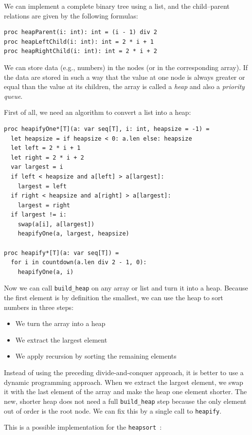 \documentclass[justified, sixbynine]{tufte-book}
\def\ft{\small\tt}
\theoremstyle{plain}%
\newtheorem * {corollary}{Corollary}
\theoremstyle{definition}
\theoremstyle{remark}
\newtheorem * {remark}{Remark}
\newtheorem * {note}{Note}
\begin{document}
\begin{fullwidth}
We can implement a complete binary tree using a list, and the child--parent relations are given by the following formulas:
\begin{lstlisting}
proc heapParent(i: int): int = (i - 1) div 2
proc heapLeftChild(i: int): int = 2 * i + 1
proc heapRightChild(i: int): int = 2 * i + 2
\end{lstlisting}

We can store data (e.g., numbers) in the nodes (or in the corresponding array). If the data are
stored in such a way that the value at one node is always greater or equal than the value at its children, the array is called a {\it heap} and also a {\it priority queue}.

First of all, we need an algorithm to convert a list into a heap:

\begin{lstlisting}
proc heapifyOne*[T](a: var seq[T], i: int, heapsize = -1) =
  let heapsize = if heapsize < 0: a.len else: heapsize
  let left = 2 * i + 1
  let right = 2 * i + 2
  var largest = i
  if left < heapsize and a[left] > a[largest]:
    largest = left
  if right < heapsize and a[right] > a[largest]:
    largest = right
  if largest != i:
    swap(a[i], a[largest])
    heapifyOne(a, largest, heapsize)

proc heapify*[T](a: var seq[T]) =
  for i in countdown(a.len div 2 - 1, 0):
    heapifyOne(a, i)
\end{lstlisting}

Now we can call {\ft build\_heap} on any array or list and turn it into a heap.
Because the first element is by definition the smallest, we can use the heap to sort numbers in three steps:
\begin{itemize}
\item We turn the array into a heap
\item We extract the largest element
\item We apply recursion by sorting the remaining elements
\end{itemize}
Instead of using the preceding divide-and-conquer approach, it is better to use a dynamic programming approach. When we extract the largest element, we swap it with the last element of the array and make the heap one element shorter. The new, shorter heap does not need a full {\ft build\_heap} step because the only element out of order is the root node. We can fix this by a single call to {\ft heapify}.

This is a possible implementation for the {\ft heapsort}~\cite{heapsort}:


\end{fullwidth}
\end{document}
